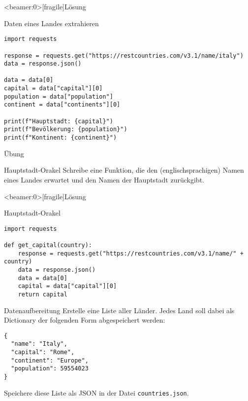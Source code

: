 \begin{frame}<beamer:0>[fragile]{Lösung}
\begin{solutionblock}{Daten eines Landes extrahieren}
\begin{verbatim}
import requests

response = requests.get("https://restcountries.com/v3.1/name/italy")
data = response.json()

data = data[0]
capital = data["capital"][0]
population = data["population"]
continent = data["continents"][0]

print(f"Hauptstadt: {capital}")
print(f"Bevölkerung: {population}")
print(f"Kontinent: {continent}")
\end{verbatim}
\end{solutionblock}
\end{frame}










\begin{frame}{Übung}

\begin{block}{Hauptstadt-Orakel}
\vspace{2pt}
Schreibe eine Funktion, die den (englischsprachigen) Namen eines Landes erwartet und den Namen der Hauptstadt zurückgibt.
\end{block}
\end{frame}





\begin{frame}<beamer:0>[fragile]{Lösung}
\begin{solutionblock}{Hauptstadt-Orakel}
\begin{verbatim}
import requests

def get_capital(country): 
    response = requests.get("https://restcountries.com/v3.1/name/" + country)
    data = response.json()
    data = data[0]
    capital = data["capital"][0]
    return capital
\end{verbatim}
\end{solutionblock}
\end{frame}








\begin{fragile}[Übung]
\begin{block}{Datenaufbereitung}
\vspace{2pt}
Erstelle eine Liste aller Länder. Jedes Land soll dabei als Dictionary der folgenden Form abgespeichert werden: 
\begin{verbatim}
{
  "name": "Italy",
  "capital": "Rome",
  "continent": "Europe", 
  "population": 59554023
}
\end{verbatim} 
Speichere diese Liste als JSON in der Datei \texttt{countries.json}. 
\end{block}
\end{fragile}

